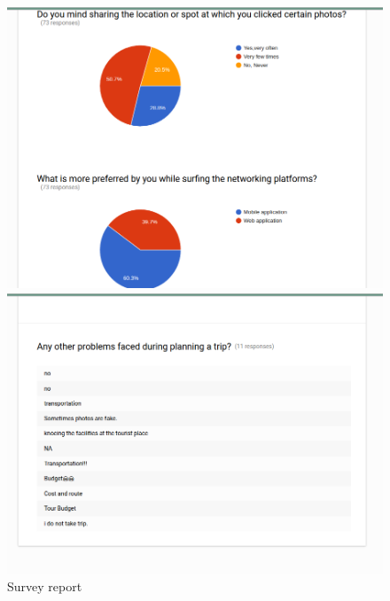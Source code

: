 \documentclass[]{article}
\begin{document}
\begin{figure}
  \includegraphics[width=\linewidth]{5.png}
  

  \includegraphics[width=\linewidth]{6.png}
  \caption{ Survey report}
  
\end{figure}
\end{document}
